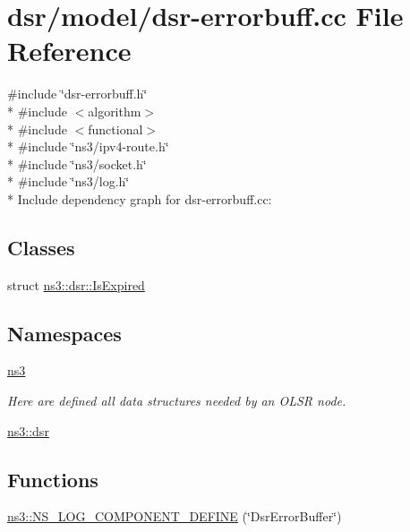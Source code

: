 \hypertarget{dsr-errorbuff_8cc}{}\section{dsr/model/dsr-\/errorbuff.cc File Reference}
\label{dsr-errorbuff_8cc}
{\ttfamily \#include \char`\"{}dsr-\/errorbuff.\+h\char`\"{}}\\*
{\ttfamily \#include $<$algorithm$>$}\\*
{\ttfamily \#include $<$functional$>$}\\*
{\ttfamily \#include \char`\"{}ns3/ipv4-\/route.\+h\char`\"{}}\\*
{\ttfamily \#include \char`\"{}ns3/socket.\+h\char`\"{}}\\*
{\ttfamily \#include \char`\"{}ns3/log.\+h\char`\"{}}\\*
Include dependency graph for dsr-\/errorbuff.cc\+:
\subsection*{Classes}
\begin{DoxyCompactItemize}
\item 
struct \hyperlink{structns3_1_1dsr_1_1IsExpired}{ns3\+::dsr\+::\+Is\+Expired}
\end{DoxyCompactItemize}
\subsection*{Namespaces}
\begin{DoxyCompactItemize}
\item 
 \hyperlink{namespacens3}{ns3}
\begin{DoxyCompactList}\small\item\em Here are defined all data structures needed by an O\+L\+SR node. \end{DoxyCompactList}\item 
 \hyperlink{namespacens3_1_1dsr}{ns3\+::dsr}
\end{DoxyCompactItemize}
\subsection*{Functions}
\begin{DoxyCompactItemize}
\item 
\hyperlink{namespacens3_ab25ba02bc2a989b7417633866ae7aec2}{ns3\+::\+N\+S\+\_\+\+L\+O\+G\+\_\+\+C\+O\+M\+P\+O\+N\+E\+N\+T\+\_\+\+D\+E\+F\+I\+NE} (\char`\"{}Dsr\+Error\+Buffer\char`\"{})
\end{DoxyCompactItemize}
